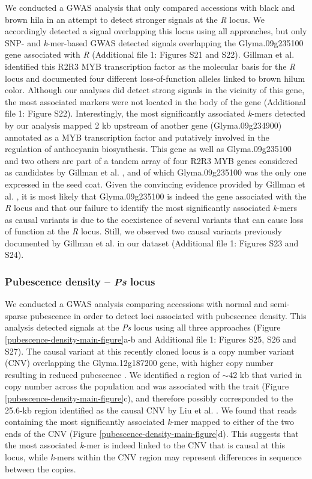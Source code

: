\documentclass[doublespacing]{bmcart}
\begin{document}
We conducted a GWAS analysis that only compared accessions with black and brown
hila in an attempt to detect stronger signals at the \textit{R} locus.  We
accordingly detected a signal overlapping this locus using all approaches, but
only SNP- and \textit{k}-mer-based GWAS detected signals overlapping the
Glyma.09g235100 gene associated with \textit{R} (Additional file 1: Figures
S21 and S22).
Gillman et al. \cite{gillman2011} identified this R2R3 MYB transcription factor as the
molecular basis for the \textit{R} locus and documented four different
loss-of-function alleles linked to brown hilum color. Although our analyses did
detect strong signals in the vicinity of this gene, the most associated markers
were not located in the body of the gene (Additional file 1: Figure
S22).  Interestingly, the most significantly
associated \emph{k}-mers detected by our analysis mapped 2 kb upstream of
another gene (Glyma.09g234900) annotated as a MYB transcription factor and
putatively involved in the regulation of anthocyanin biosynthesis. This gene as
well as Glyma.09g235100 and two others are part of a tandem array of four R2R3
MYB genes considered as candidates by Gillman et al. \cite{gillman2011}, and of which
Glyma.09g235100 was the only one expressed in the seed coat. Given the
convincing evidence provided by Gillman et al. \cite{gillman2011}, it is most likely that
Glyma.09g235100 is indeed the gene associated with the \emph{R} locus and that
our failure to identify the most significantly associated \emph{k}-mers as
causal variants is due to the coexistence of several variants that can cause
loss of function at the \emph{R} locus.  Still, we observed two causal variants
previously documented by Gillman et al. \cite{gillman2011} in our dataset (Additional file 1: Figures
S23 and S24). 

\subsubsection*{Pubescence density -- \textit{Ps} locus}

We conducted a GWAS analysis comparing accessions with normal and semi-sparse
pubes\-cence in order to detect loci associated with pubescence density. This analysis
detected signals at the \textit{Ps} locus using all three approaches (Figure
\ref{pubescence-density-main-figure}a-b and Additional file 1: Figures S25, S26
and S27). The causal
variant at this recently cloned locus is a copy number variant (CNV) overlapping the
Glyma.12g187200 gene, with higher copy number resulting in reduced pubescence \citep{liu2020ps}.
We identified a region of $\sim$42 kb that varied in copy number across
the population and was associated with the trait (Figure
\ref{pubescence-density-main-figure}c), and therefore possibly corresponded to the
25.6-kb region identified as the causal CNV by Liu et al. \cite{liu2020ps}. We found that
reads containing the most significantly associated \textit{k}-mer mapped to either of the two ends
of the CNV (Figure \ref{pubescence-density-main-figure}d). This suggests that
the most associated \textit{k}-mer is indeed linked to the CNV
that is causal at this locus, while \textit{k}-mers within the
CNV region may represent differences in sequence between the copies.
\end{document}
